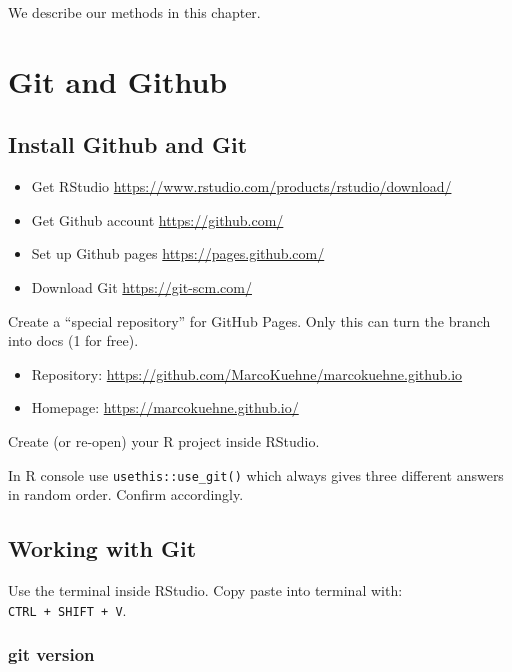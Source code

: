 \documentclass[
]{book}
\providecommand{\tightlist}{%
  \setlength{\itemsep}{0pt}\setlength{\parskip}{0pt}}
\begin{document}
We describe our methods in this chapter.

\hypertarget{git-and-github}{%
\chapter{Git and Github}\label{git-and-github}}

\hypertarget{install-github-and-git}{%
\section{Install Github and Git}\label{install-github-and-git}}

\begin{itemize}
\tightlist
\item
  Get RStudio \url{https://www.rstudio.com/products/rstudio/download/}
\item
  Get Github account \url{https://github.com/}
\item
  Set up Github pages \url{https://pages.github.com/}
\item
  Download Git \url{https://git-scm.com/}
\end{itemize}

Create a ``special repository'' for GitHub Pages. Only this can turn the branch into docs (1 for free).

\begin{itemize}
\tightlist
\item
  Repository: \url{https://github.com/MarcoKuehne/marcokuehne.github.io}
\item
  Homepage: \url{https://marcokuehne.github.io/}
\end{itemize}

Create (or re-open) your R project inside RStudio.

In R console use \texttt{usethis::use\_git()} which always gives three different answers in random order. Confirm accordingly.

\hypertarget{working-with-git}{%
\section{Working with Git}\label{working-with-git}}

Use the terminal inside RStudio. Copy paste into terminal with: \texttt{CTRL\ +\ SHIFT\ +\ V}.

\hypertarget{git-version}{%
\subsection{git version}\label{git-version}}
\end{document}
